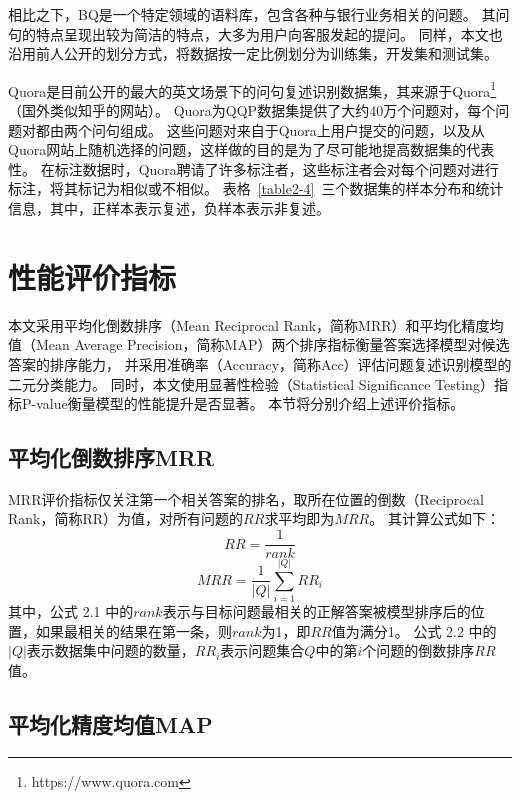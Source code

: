 相比之下，BQ是一个特定领域的语料库，包含各种与银行业务相关的问题。
其问句的特点呈现出较为简洁的特点，大多为用户向客服发起的提问。
同样，本文也沿用前人公开的划分方式，将数据按一定比例划分为训练集，开发集和测试集。

Quora是目前公开的最大的英文场景下的问句复述识别数据集，其来源于Quora\footnote{https://www.quora.com}（国外类似知乎的网站）。
Quora为QQP数据集提供了大约40万个问题对，每个问题对都由两个问句组成。
这些问题对来自于Quora上用户提交的问题，以及从Quora网站上随机选择的问题，这样做的目的是为了尽可能地提高数据集的代表性。
在标注数据时，Quora聘请了许多标注者，这些标注者会对每个问题对进行标注，将其标记为相似或不相似。
表格~\ref{table2-4}~三个数据集的样本分布和统计信息，其中，正样本表示复述，负样本表示非复述。



\section{性能评价指标}
\label{2.3 性能评价指标}

本文采用平均化倒数排序（Mean Reciprocal Rank，简称MRR）和平均化精度均值（Mean Average Precision，简称MAP）两个排序指标衡量答案选择模型对候选答案的排序能力，
并采用准确率（Accuracy，简称Acc）评估问题复述识别模型的二元分类能力。
同时，本文使用显著性检验（Statistical Significance Testing）\cite{dror2018hitchhiker}指标P-value衡量模型的性能提升是否显著。
本节将分别介绍上述评价指标。

\subsection{平均化倒数排序MRR}

MRR评价指标仅关注第一个相关答案的排名，取所在位置的倒数（Reciprocal Rank，简称RR）为值，对所有问题的$RR$求平均即为$MRR$。
其计算公式如下：
\begin{equation}
    RR = \frac{1}{rank}
\end{equation}
\begin{equation}
    MRR = \frac{1}{|Q|} \sum_{i=1}^{|Q|}RR_i
\end{equation}
其中，公式 2.1 中的$rank$表示与目标问题最相关的正解答案被模型排序后的位置，如果最相关的结果在第一条，则$rank$为1，即$RR$值为满分1。
公式 2.2 中的$|Q|$表示数据集中问题的数量，$RR_i$表示问题集合$Q$中的第$i$个问题的倒数排序$RR$值。

\subsection{平均化精度均值MAP}

